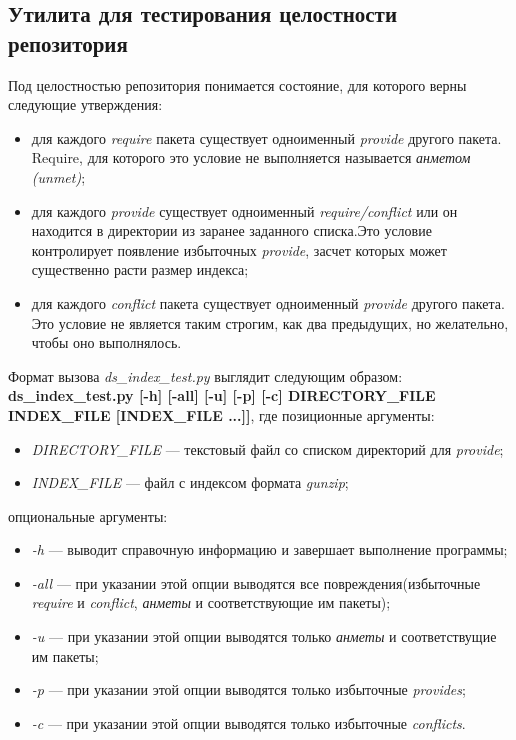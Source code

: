 \subsection{Утилита для тестирования целостности репозитория}
Под целостностью репозитория понимается состояние, для которого
верны следующие утверждения:
\begin{itemize}
\item{для каждого \textit{require} пакета существует одноименный \textit{provide} 
другого пакета. Require, для которого это условие не выполняется
называется \textit{анметом (unmet)}; }
\item{для каждого \textit{provide} существует одноименный \textit{require/conflict} или
он находится в директории из заранее заданного списка.Это условие 
контролирует появление избыточных \textit{provide}, засчет которых %
может существенно расти размер индекса;}
\item{для каждого \textit{conflict} пакета существует одноименный \textit{provide} 
другого пакета. Это условие не является таким строгим, как два предыдущих,
но желательно, чтобы оно выполнялось. }
\end{itemize}

Формат вызова \textit{ds\_index\_test.py} выглядит следующим образом:\\
\textbf{ds\_index\_test.py [-h] [-all] [-u] [-p] [-c] DIRECTORY\_FILE INDEX\_FILE [INDEX\_FILE ...]]},
 где
позиционные аргументы:\\
\begin{itemize}


\item{\emph{DIRECTORY\_FILE} --- текстовый файл со списком директорий для \textit{provide};}
\item{\emph{INDEX\_FILE} --- файл с индексом формата \textit{gunzip};}
\end{itemize}

опциональные аргументы:\\
\begin{itemize}
\item{\emph{-h} --- выводит справочную информацию и завершает выполнение программы;}
\item{\emph{-all} --- при указании этой опции выводятся все повреждения(избыточные \textit{require} и \textit{conflict}, \textit{анметы} и
соответствующие им пакеты);}
\item{\emph{-u} --- при указании этой опции выводятся только \textit{анметы} и соответствущие им пакеты;}
\item{\emph{-p} --- при указании этой опции выводятся только  избыточные \textit{provides};}
\item{\emph{-c} --- при указании этой опции выводятся только избыточные \textit{conflicts}.}

\end{itemize}


